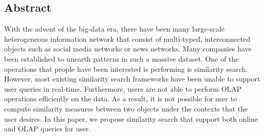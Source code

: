 \subsection*{Abstract}

With the advent of the big-data era, there have been many large-scale
heterogeneous information network that consist of multi-typed, interconnected
objects such as social media networks or news networks. Many companies have
been established to unearth patterns in such a massive dataset. One of the
operations that people have been interested is performing is similarity search.
However, most existing similarity search frameworks have been unable to support
user queries in real-time. Furthermore, users are not able to perform OLAP
operations efficiently on the data. As a result, it is not possible for user to
compute similarity measures between two objects under the contexts that the
user desires. In this paper, we propose similarity search that support both
online and OLAP queries for user.
